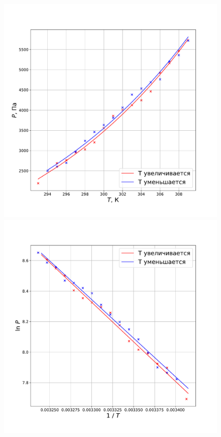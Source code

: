 \documentclass[a4paper, 12pt]{article}
\begin{document}
\begin{figure}[!h]
    \includegraphics[scale = 0.3]{Plot1}
    \includegraphics[scale = 0.3]{Plot2}
\end{figure}
\end{document}
